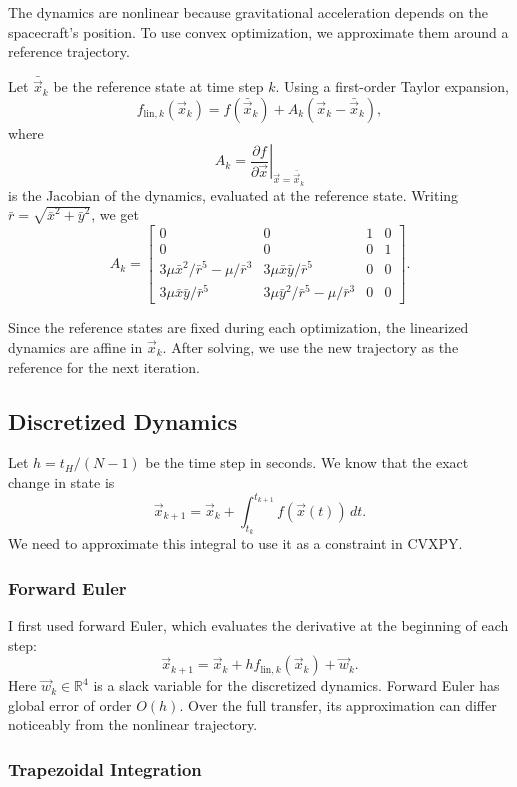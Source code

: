 \documentclass{article}
\begin{document}
The dynamics are nonlinear because gravitational acceleration depends on the spacecraft's position. To use convex optimization, we approximate them around a reference trajectory.

Let $\bar{\vec{x}}_k$ be the reference state at time step $k$. Using a first-order Taylor expansion,
\[
\boxed{
f_{\mathrm{lin},k}(\vec{x}_k)
=f(\bar{\vec{x}}_k)+A_k(\vec{x}_k-\bar{\vec{x}}_k),
}
\]
where
\[
A_k=\left.\frac{\partial f}{\partial\vec{x}}\right|_{\vec{x}=\bar{\vec{x}}_k}
\]
is the Jacobian of the dynamics, evaluated at the reference state. Writing $\bar r=\sqrt{\bar x^2+\bar y^2}$, we get
\[
A_k=\begin{bmatrix}
0&0&1&0\\
0&0&0&1\\
3\mu\bar x^2/\bar r^5-\mu/\bar r^3&3\mu\bar x\bar y/\bar r^5&0&0\\
3\mu\bar x\bar y/\bar r^5&3\mu\bar y^2/\bar r^5-\mu/\bar r^3&0&0
\end{bmatrix}.
\]

Since the reference states are fixed during each optimization, the linearized dynamics are affine in $\vec{x}_k$. After solving, we use the new trajectory as the reference for the next iteration.

\subsection{Discretized Dynamics}

Let $h=t_H/(N-1)$ be the time step in seconds. We know that the exact change in state is
\[
\vec{x}_{k+1}
=\vec{x}_k+\int_{t_k}^{t_{k+1}} f(\vec{x}(t))\,dt.
\]
We need to approximate this integral to use it as a constraint in CVXPY.

\subsubsection*{Forward Euler}

I first used forward Euler, which evaluates the derivative at the beginning of each step:
\[
\boxed{
\vec{x}_{k+1}=\vec{x}_k
+h f_{\mathrm{lin},k}(\vec{x}_k)+\vec{w}_k.
}
\]
Here $\vec{w}_k\in\mathbb R^4$ is a slack variable for the discretized dynamics. Forward Euler has global error of order $O(h)$. Over the full transfer, its approximation can differ noticeably from the nonlinear trajectory.

\subsubsection*{Trapezoidal Integration}
\end{document}
